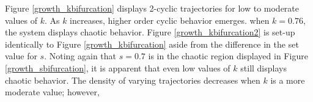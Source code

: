 Figure \ref{growth_kbifurcation} displays 2-cyclic trajectories for low to moderate values of $k$. As $k$ increases, higher order cyclic behavior emerges. when $k=0.76$, the system displays chaotic behavior. Figure \ref{growth_kbifurcation2} is set-up identically to Figure \ref{growth_kbifurcation} aside from the difference in the set value for $s$. Noting again that $s=0.7$ is in the chaotic region displayed in Figure \ref{growth_sbifurcation}, it is apparent that even low values of $k$ still displays chaotic behavior. The density of varying trajectories decreases when $k$ is a more moderate value; however, 











